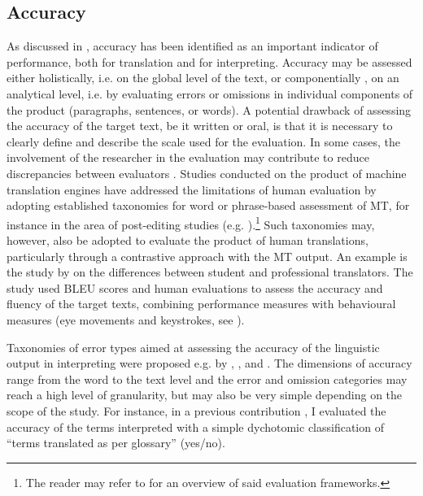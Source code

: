\subsection{Accuracy} \label{accuracy_performance}
As discussed in , accuracy has been identified as an important indicator of performance, both for translation and for interpreting. Accuracy may be assessed either holistically, i.e. on the global level of the text, or componentially \citep[3]{tiselius_accuracy_2015}, on an analytical level, i.e. by evaluating errors or omissions in individual components of the product (paragraphs, sentences, or words). A potential drawback of assessing the accuracy of the target text, be it written or oral, is that it is necessary to clearly define and describe the scale used for the evaluation. In some cases, the involvement of the researcher in the evaluation may contribute to reduce discrepancies between evaluators \citep[395--397]{hansen_thoughts_2009}. Studies conducted on the product of machine translation engines have addressed the limitations of human evaluation by adopting established taxonomies for word or phrase-based assessment of MT, for instance in the area of post-editing studies (e.g. \citealt{vardaro_translation_2019,marzouk_german_2021}).\footnote{The reader may refer to  for an overview of said evaluation frameworks.} Such taxonomies may, however, also be adopted to evaluate the product of human translations, particularly through a contrastive approach with the MT output. An example is the study by \citet{carl_correlating_2010} on the differences between student and professional translators. The study used BLEU scores and human evaluations to assess the accuracy and fluency of the target texts, combining performance measures with behavioural measures (eye movements and keystrokes, see ).

Taxonomies of error types aimed at assessing the accuracy of the linguistic output in interpreting were proposed e.g. by \citet{barik_description_1971}, \citet{lambert_error_1994}, \citet[2002]{wadensjo_double_1993} and \citet{napier_interpreting_2004,napier_linguistic_2016}. The dimensions of accuracy range from the word to the text level and the error and omission categories may reach a high level of granularity, but may also be very simple depending on the scope of the study. For instance, in a previous contribution \citep{prandi_uso_2015,prandi_use_2015}, I evaluated the accuracy of the terms interpreted with a simple dychotomic classification of ``terms translated as per glossary'' (yes/no).







